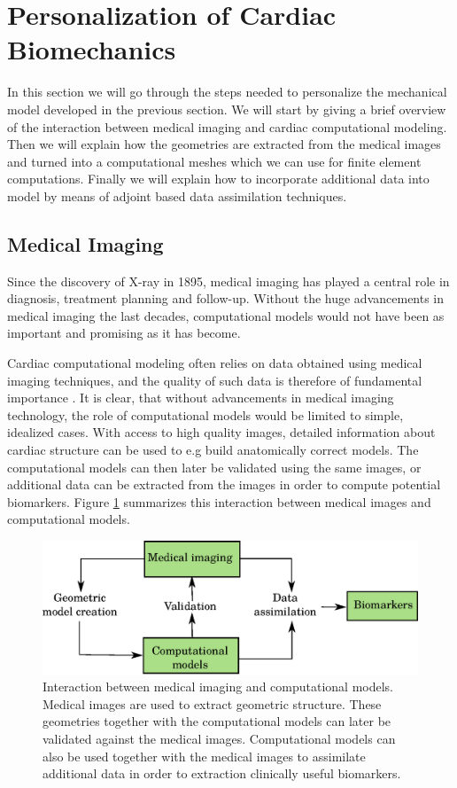 \section{Personalization of Cardiac Biomechanics}
\label{sec:intro_personalization}
In this section we will go through the steps needed to personalize the
mechanical model developed in the previous section. We will start by
giving a brief overview of the interaction between medical imaging and
cardiac computational modeling. Then we will explain how the geometries
are extracted from the medical images and turned into a computational
meshes which we can use for finite element computations. Finally we
will explain how to incorporate additional data into model by means of
adjoint based data assimilation techniques.


\subsection{Medical Imaging}

Since the discovery of X-ray in 1895, medical imaging has played a central
role in diagnosis, treatment planning and follow-up. Without the huge
advancements in medical imaging the last decades, computational models
would not have been as important and promising as it has become.


Cardiac computational modeling often relies on data obtained using
medical imaging techniques, and the quality of such data is therefore of
fundamental importance \cite{lamata2014images}. It is clear, that
without advancements in medical imaging technology, the role of
computational models would be limited to simple, idealized cases. With
access to high quality images, detailed information about cardiac structure
can be used to e.g build anatomically correct models. The
computational models can then later be validated using the same
images, or additional data can be extracted from the images in order to
compute potential biomarkers. Figure \ref{fig:cardiac_imaging_model} summarizes
this interaction between medical images and computational models. 

\begin{figure}[htbp]
  \centering
    \includegraphics[width=\textwidth]{chapters/introduction/figures/models.eps}
\caption{Interaction between medical imaging and computational
  models. Medical images are used to extract geometric
  structure. These geometries together with the computational models
  can later be validated against the medical images. Computational
  models can also be used together with the medical images to
  assimilate additional data in order to extraction clinically useful
  biomarkers. }
\label{fig:cardiac_imaging_model}
\end{figure}



